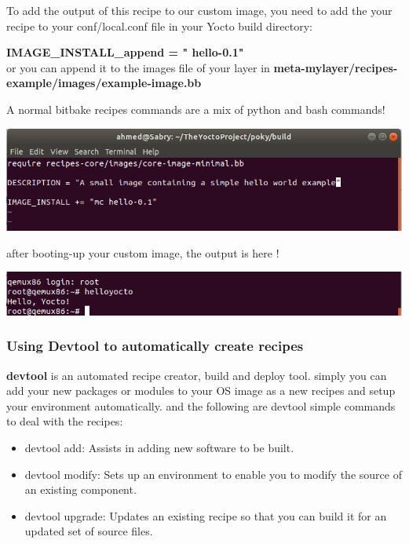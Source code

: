 \documentclass{article}
\begin{document}
To add the output of this recipe to our custom image, you need to add the your recipe to your conf/local.conf file in your Yocto build directory:

\textbf{IMAGE\_INSTALL\_append = " hello-0.1"}\\

or you can append it to the images file of your layer in \textbf{meta-mylayer/recipes-example/images/example-image.bb}

\begin{mybox}[title={Note: Recipes programming commands}]
  A normal bitbake recipes commands are a mix of python and bash commands!  
\end{mybox}

\begin{center}
  \includegraphics[scale=0.60]{./resources/img/add-hello-to-image-recipe.png}
\end{center}

after booting-up your custom image,  the output is here !
\begin{center}
  \includegraphics[scale=0.60]{./resources/img/hello-yocto-recipe.png}
\end{center}

\subsubsection{Using Devtool to automatically create recipes}
\textbf{devtool} is an automated recipe creator, build and deploy tool. simply you can add your new packages or modules to your OS image as a new recipes and setup your environment automatically. and the following are devtool simple commands to deal with the recipes:

\begin{itemize}
\item devtool add: Assists in adding new software to be built.
\item devtool modify: Sets up an environment to enable you to modify the source of an existing component.
\item devtool upgrade: Updates an existing recipe so that you can build it for an updated set of source files.
\end{itemize}
\end{document}
